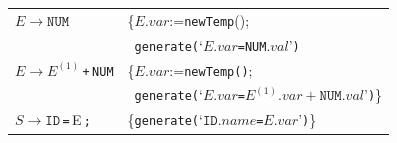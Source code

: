 \documentclass[dvipdfmx]{jarticle}
\newcommand{\ttlp}{{\tt (}}
\newcommand{\ttrp}{{\tt )}}
\newcommand{\tteq}{{\tt =}}
\newcommand{\newTempnull}{{\tt newTemp}}
\newcommand{\genassign}[2]{{\tt generate}\ttlp`{#1}\tteq{#2}'\ttrp}
\begin{document}
\begin{tabular}{ll}
  $E\rightarrow\texttt{NUM}$ & \{$E.var$:=\newTempnull();\\
  & \ \genassign{$E.var$}{\texttt{NUM}$.val$}\\
  $E\rightarrow E^{(1)}$\,\texttt{+}\,\texttt{NUM}
  & \{{$E.var$:=\texttt{newTemp()};}\\
  & \ \genassign{$E.var$}{$E^{(1)}.var+\texttt{NUM}.val$}\}\\
  $S\rightarrow\texttt{ID}$\,\texttt{=}\,E\,\texttt{;}
  & \{\genassign{$\texttt{ID}.name$}{$E.var$}\}
\end{tabular}
\end{document}
